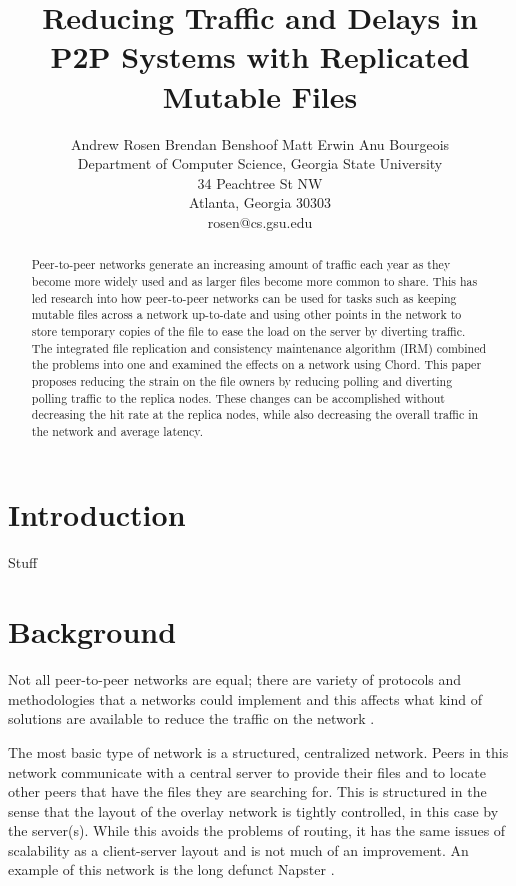 \documentclass[10pt, conference, compsocconf, letterpaper]{IEEEtran}
\title{Reducing Traffic and Delays in P2P Systems with Replicated Mutable Files}
\author{
Andrew Rosen \qquad Brendan Benshoof \qquad Matt Erwin \qquad Anu Bourgeois  \\Department of Computer Science, Georgia State University\\ 34 Peachtree St NW \\ Atlanta, Georgia 30303\\  rosen@cs.gsu.edu }
\begin{document}
\maketitle

\begin{abstract}
Peer-to-peer networks generate an increasing amount of traffic each year as they become more widely used and as larger files become more common to share. This has led research into how peer-to-peer networks can be used for tasks such as keeping mutable files across a network up-to-date and using other points in the network to store temporary copies of the file to ease the load on the server by diverting traffic. The integrated file replication and consistency maintenance algorithm (IRM) combined the problems into one and examined the effects on a network using Chord. This paper proposes reducing the strain on the file owners by reducing polling and diverting  polling traffic to the replica nodes.  These changes can be accomplished without decreasing the hit rate at the replica nodes, while also decreasing the overall traffic in the network and average latency.
\end{abstract}



\section{Introduction}
Stuff

\section{Background}
Not all peer-to-peer networks are equal; there are variety of protocols and methodologies that a networks could implement and this affects what kind of solutions are available to reduce the traffic on the network    \cite{SurveyCompare} \cite{Overview}.

The most basic type of network is a structured, centralized  network.  Peers in this network communicate with a central server to provide their files and to locate other peers that have the files they are searching for.  This is structured in the sense that the layout of the overlay network is tightly controlled, in this case by the server(s). While this avoids the problems of routing, it has the same issues of scalability as a client-server layout and is not much of an improvement. An example of this network is the long defunct Napster  \cite{SurveyCompare} \cite{Overview}.
\end{document}
